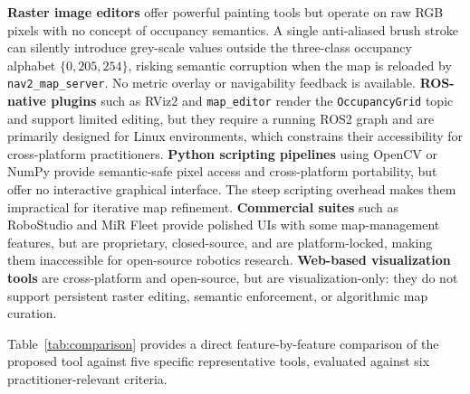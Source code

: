 \documentclass{IEEE_lsens}
\begin{document}
\textbf{Raster image editors} \cite{gimp} offer powerful painting tools but operate on raw RGB pixels with no concept of occupancy semantics. A single anti-aliased brush stroke can silently introduce grey-scale values outside the three-class occupancy alphabet $\{0,205,254\}$, risking semantic corruption when the map is reloaded by \texttt{nav2\_map\_server}. No metric overlay or navigability feedback is available.
\textbf{ROS-native plugins} such as RViz2 \cite{rviz2} and \texttt{map\_editor} \cite{mapeditor} render the \texttt{OccupancyGrid} topic and support limited editing, but they require a running ROS2 graph and are primarily designed for Linux environments, which constrains their accessibility for cross-platform practitioners.
\textbf{Python scripting pipelines} using OpenCV or NumPy provide semantic-safe pixel access and cross-platform portability, but offer no interactive graphical interface. The steep scripting overhead makes them impractical for iterative map refinement.
\textbf{Commercial suites} such as RoboStudio \cite{robostudio} and MiR Fleet \cite{mirfleet} provide polished UIs with some map-management features, but are proprietary, closed-source, and are platform-locked, making them inaccessible for open-source robotics research.
\textbf{Web-based visualization tools} \cite{foxglove,webviz} are cross-platform and open-source, but are visualization-only: they do not support persistent raster editing, semantic enforcement, or algorithmic map curation.

Table~\ref{tab:comparison} provides a direct feature-by-feature comparison of the proposed tool against five specific representative tools, evaluated against six practitioner-relevant criteria.
\end{document}
